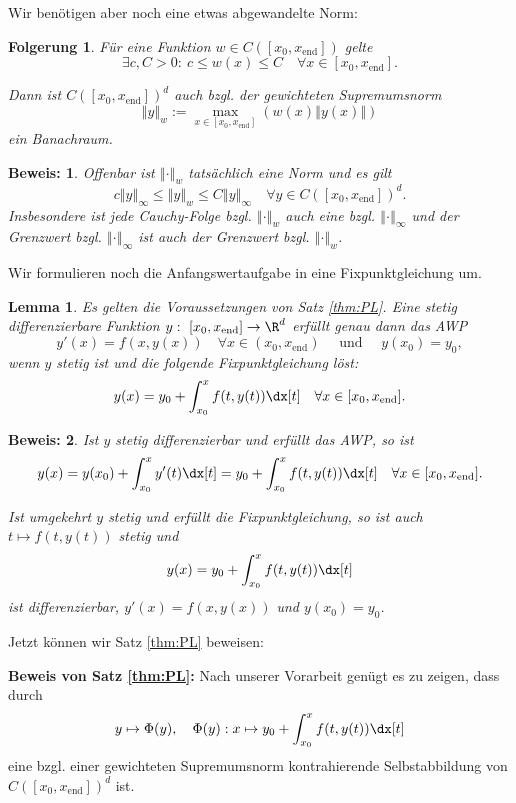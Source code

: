 \documentclass[
]{mycourse}
\theoremstyle{mythm}
\newtheorem{korollar}[theorem]{Folgerung}
\newtheorem{lemma}[theorem]{Lemma}
\theoremstyle{break}
\newtheorem*{beweis}{Beweis:}
\newcommand{\norm}[1]{\left\Vert#1\right\Vert}		%
\begin{document}
Wir benötigen aber noch eine etwas abgewandelte Norm:
\begin{korollar}\label{kor:gewSupNorm}
Für eine Funktion $w\in C([x_0,x_\mathrm{end}])$ gelte
\[
\exists c,C>0:\ c\leq w(x)\leq C \quad \forall x\in [x_0,x_\mathrm{end}].
\]

Dann ist $C([x_0,x_\mathrm{end}])^d$ auch bzgl. der 
\emph{gewichteten Supremumsnorm} 
\[
\norm{y}_w:= \max_{x\in [x_0,x_\mathrm{end}]} \left( w(x) \norm{y(x)}\right)
\]
ein Banachraum.
\end{korollar}
\begin{beweis}
Offenbar ist $\norm{\cdot}_w$ tatsächlich eine Norm und es gilt 
\[
c\norm{y}_\infty \leq \norm{y}_w\leq C\norm{y}_\infty \quad \forall y\in C([x_0,x_\mathrm{end}])^d.
\]
Insbesondere ist jede Cauchy-Folge bzgl. $\norm{\cdot}_w$ auch eine bzgl. $\norm{\cdot}_\infty$ und
der Grenzwert bzgl. $\norm{\cdot}_\infty$ ist auch der Grenzwert bzgl. $\norm{\cdot}_w$.
\end{beweis}

Wir formulieren noch die Anfangswertaufgabe in eine Fixpunktgleichung um.
\begin{lemma}\label{lemma:PL_hilf}
Es gelten die Voraussetzungen von  Satz \ref{thm:PL}. Eine 
stetig differenzierbare Funktion $y:\ [x_0,x_\mathrm{end}]\to \R^d$ erfüllt genau dann das AWP
\[
y'(x)=f(x,y(x)) \quad \forall x\in (x_0,x_\mathrm{end}) \quad \mbox{ und } \quad y(x_0)=y_0,
\]
wenn $y$ stetig ist und die folgende Fixpunktgleichung löst:
\[
y(x)=y_0+ \int_{x_0}^x f(t,y(t))\dx[t] \quad \forall x\in  [x_0,x_\mathrm{end}].
\]
\end{lemma}
\begin{beweis}
Ist $y$ stetig differenzierbar und erfüllt das AWP, so ist 
\[
y(x)=y(x_0)+\int_{x_0}^x y'(t) \dx[t]=y_0+ \int_{x_0}^x f(t,y(t))\dx[t] \quad \forall x\in  [x_0,x_\mathrm{end}].
\]

Ist umgekehrt $y$ stetig und erfüllt die Fixpunktgleichung,
so ist auch $t\mapsto f(t,y(t))$ stetig und
\[
y(x)=y_0+ \int_{x_0}^x f(t,y(t))\dx[t]
\]
ist differenzierbar, $y'(x)=f(x,y(x))$ und $y(x_0)=y_0$.
\end{beweis}

Jetzt können wir Satz \ref{thm:PL} beweisen:

\textbf{Beweis von Satz \ref{thm:PL}:} Nach unserer Vorarbeit genügt es zu zeigen, 
dass durch
\[
y \mapsto \Phi(y), \quad \Phi(y): x\mapsto y_0+ \int_{x_0}^x f(t,y(t))\dx[t]
\]
eine bzgl. einer gewichteten Supremumsnorm kontrahierende Selbstabbildung von 
$C([x_0,x_\mathrm{end}])^d$ ist.
\end{document}
